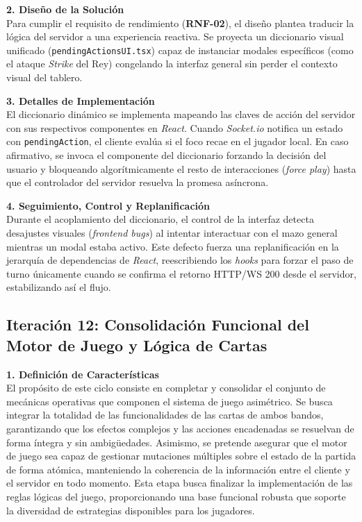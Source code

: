 \textbf{2. Diseño de la Solución} \\
Para cumplir el requisito de rendimiento (\textbf{RNF-02}), el diseño plantea traducir la lógica del servidor a una experiencia reactiva. Se proyecta un diccionario visual unificado (\texttt{pendingActionsUI.tsx}) capaz de instanciar modales específicos (como el ataque \textit{Strike} del Rey) congelando la interfaz general sin perder el contexto visual del tablero.

\textbf{3. Detalles de Implementación} \\
El diccionario dinámico se implementa mapeando las claves de acción del servidor con sus respectivos componentes en \textit{React}. Cuando \textit{Socket.io} notifica un estado con \texttt{pendingAction}, el cliente evalúa si el foco recae en el jugador local. En caso afirmativo, se invoca el componente del diccionario forzando la decisión del usuario y bloqueando algorítmicamente el resto de interacciones (\textit{force play}) hasta que el controlador del servidor resuelva la promesa asíncrona.

\textbf{4. Seguimiento, Control y Replanificación} \\
Durante el acoplamiento del diccionario, el control de la interfaz detecta desajustes visuales (\textit{frontend bugs}) al intentar interactuar con el mazo general mientras un modal estaba activo. Este defecto fuerza una replanificación en la jerarquía de dependencias de \textit{React}, reescribiendo los \textit{hooks} para forzar el paso de turno únicamente cuando se confirma el retorno HTTP/WS 200 desde el servidor, estabilizando así el flujo.

\subsection{Iteración 12: Consolidación Funcional del Motor de Juego y Lógica de Cartas}

\textbf{1. Definición de Características} \\
El propósito de este ciclo consiste en completar y consolidar el conjunto de mecánicas operativas que componen el sistema de juego asimétrico. Se busca integrar la totalidad de las funcionalidades de las cartas de ambos bandos, garantizando que los efectos complejos y las acciones encadenadas se resuelvan de forma íntegra y sin ambigüedades. Asimismo, se pretende asegurar que el motor de juego sea capaz de gestionar mutaciones múltiples sobre el estado de la partida de forma atómica, manteniendo la coherencia de la información entre el cliente y el servidor en todo momento. Esta etapa busca finalizar la implementación de las reglas lógicas del juego, proporcionando una base funcional robusta que soporte la diversidad de estrategias disponibles para los jugadores.


